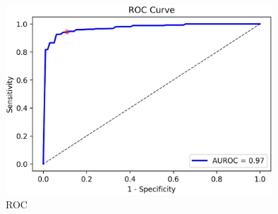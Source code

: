 \begin{figure}[htbp]
\begin{center}
\includegraphics[width=10cm]{./chapter-03-state-of-the-art/ROC.png}
\end{center}
\caption{ROC}
\label{fig:roc}
\end{figure}

